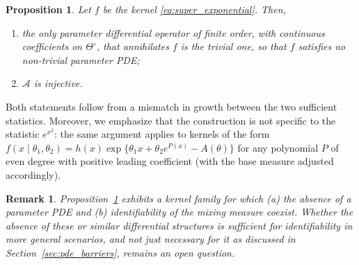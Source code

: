 \documentclass[11pt,twoside]{article} %
\newtheorem*{remark}{Remark}
\newtheorem{proposition}{Proposition}
\begin{document}
\begin{proposition}\label{prop:super_exponential}
Let $f$ be the kernel \eqref{eq:super_exponential}. Then,
%
\begin{enumerate}
    \item[(a)] the only parameter differential operator of finite order, with continuous coefficients on $\Theta^\circ$, that annihilates $f$ is the trivial one, so that $f$ satisfies no non-trivial parameter PDE;
    \item[(b)] $\mathcal A$ is injective.
\end{enumerate}
\end{proposition}

Both statements follow from a mismatch in growth between the two sufficient statistics. %
Moreover, we emphasize that the construction is not specific to the statistic $e^{x^2}$: the same argument applies to kernels of the form $f(x\mid\theta_1,\theta_2)=h(x)\exp\{\theta_1x+\theta_2e^{P(x)}-A(\theta)\}$ for any polynomial $P$ of even degree with positive leading coefficient (with the base measure adjusted accordingly). 

\begin{remark}
    Proposition~\ref{prop:super_exponential} exhibits a kernel family for which (a) the absence of a parameter PDE and (b) identifiability of the mixing measure coexist. Whether the absence of these or similar differential structures is sufficient for identifiability in more general scenarios, and not just  necessary for it as discussed in Section~\ref{sec:pde_barriers}, remains an open question. %
\end{remark}
\end{document}
